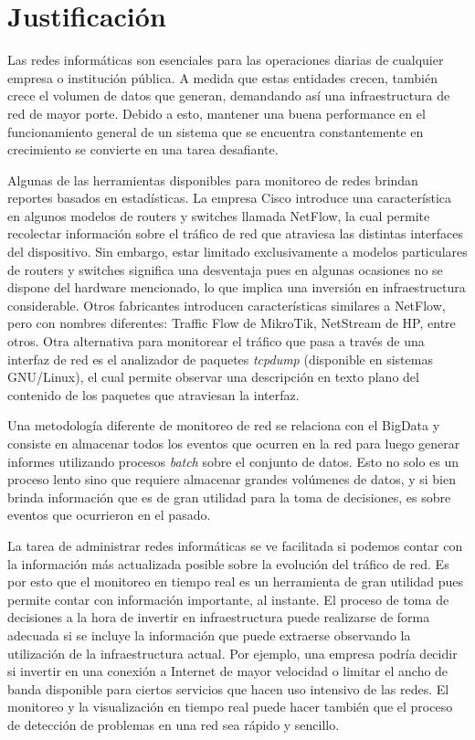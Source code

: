 \section*{Justificación}
Las redes informáticas son esenciales para las operaciones diarias de cualquier empresa o institución pública. A medida que estas entidades crecen, también crece el volumen de datos que generan, demandando así una infraestructura de red de mayor porte. Debido a esto, mantener una buena performance en el funcionamiento general de un sistema que se encuentra constantemente en crecimiento se convierte en una tarea desafiante.

Algunas de las herramientas disponibles para monitoreo de redes brindan reportes basados en estadísticas. La empresa Cisco\textsuperscript{\textregistered} introduce una característica en algunos modelos de routers y switches llamada NetFlow, la cual permite recolectar información sobre el tráfico de red que atraviesa las distintas interfaces del dispositivo. Sin embargo, estar limitado exclusivamente a modelos particulares de routers y switches significa una desventaja pues en algunas ocasiones no se dispone del hardware mencionado, lo que implica una inversión en infraestructura considerable. Otros fabricantes introducen características similares a NetFlow, pero con nombres diferentes: Traffic Flow de MikroTik, NetStream de HP, entre otros.
Otra alternativa para monitorear el tráfico que pasa a través de una interfaz de red es el analizador de paquetes \textit{tcpdump} (disponible en sistemas GNU/Linux), el cual permite observar una descripción en texto plano del contenido de los paquetes que atraviesan la interfaz.

Una metodología diferente de monitoreo de red se relaciona con el BigData y consiste en almacenar todos los eventos que ocurren en la red para luego generar informes utilizando procesos \textit{batch} sobre el conjunto de datos. Esto no solo es un proceso lento sino que requiere almacenar grandes volúmenes de datos, y si bien brinda información que es de gran utilidad para la toma de decisiones, es sobre eventos que ocurrieron en el pasado.

La tarea de administrar redes informáticas se ve facilitada si podemos contar con la información más actualizada posible sobre la evolución del tráfico de red. Es por esto que el monitoreo en tiempo real es un herramienta de gran utilidad pues permite contar con información importante, al instante. El proceso de toma de decisiones a la hora de invertir en infraestructura puede realizarse de forma adecuada si se incluye la información que puede extraerse observando la utilización de la infraestructura actual. Por ejemplo, una empresa podría decidir si invertir en una conexión a Internet de mayor velocidad o limitar el ancho de banda disponible para ciertos servicios que hacen uso intensivo de las redes. El monitoreo y la visualización en tiempo real puede hacer también que el proceso de detección de problemas en una red sea rápido y sencillo.

